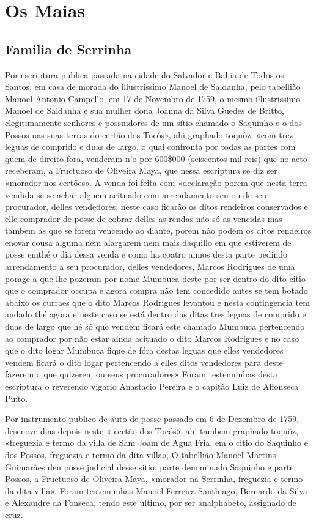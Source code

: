\chapter{Os Maias}
\section*{Familia de Serrinha}
Por escriptura publica passada na cidade do Salvador e Bahia de Todos os Santos, em casa de morada do illustrissimo Manoel de Saldanha, pelo tabellião Manoel Antonio Campello, em 17 de Novembro de 1759, o mesmo illustrissimo Manoel de Saldanha e sua mulher dona Joanna da Silva Guedes de Britto, clegitimamente senhores e possuidores de um sítio chamado o Saquinho e o dos Possos nas suas terras do certão dos Tocós», ahi graphado toquôz, «com trez leguas de comprido e duas de largo, o qual confronta por todas as partes com quem de direito fora, venderam-n'o por 600\$000 (seiscentos mil reis) que no acto receberam, a Fructuoso de Oliveira Maya, que nessa escriptura se diz ser «morador nos certões». A venda foi feita com «declaração porem que nesta terra vendida se se achar alguem acituado com arrendamento seu ou de seu procurador, delles vendedores, neste caso ficarão os ditos rendeiros conservados e elle comprador de posse de cobrar delles as rendas não só as vencidas mas tambem as que se forem vencendo ao diante, porem não podem os ditos rendeiros enovar cousa alguma nem  alargarem nem mais daquillo em que estiverem de posse emthé o dia dessa venda e como ha coatro annos desta parte pedindo arrendamento a seu procurador, delles vendedores, Marcos Rodrigues de uma porage a que lhe pozeram por nome Mumbuca deste por ser dentro do dito citio que o comprador occupa e agora compra não tem concedido antes se tem botado abaixo os curraes que o dito Marcos Rodrigues levantou e nesta contingencia tem andado thé agora e neste caso se está dentro das ditas tres leguas de comprido e duas de largo que hé só que vendem ficará este chamado Mumbuca pertencendo ao comprador por não estar ainda acituado o dito Marcos Rodrigues e no caso que o dito logar Mumbuca fique de fóra destas leguas que elles vendedores vendem ficará o dito logar pertencendo a elles ditos vendedores para deste fazerem o que quizerem ou seus procuradores» Foram testemunhas desta escriptura o reverendo vigario Anastacio Pereira e o capitão Luiz de Affonseca Pinto.

Por instrumento publico de auto de posse passado em 6 de Dezembro de 1759, desenove dias depois neste « certão dos Tocós», ahi tambem graphado toquôz, «freguezia e termo da villa de Sam Joam de Agua Fria, em o citio do Saquinho e dos Possos, freguezia e termo da dita villa», O tabellião Manoel Martins Guimarães deu posse judicial desse sitio, parte denominado Saquinho e parte Possos, a Fructuoso de Oliveira Maya, «morador na Serrinha, freguezia e termo da dita villa». Foram testemunhas Manoel Ferreira Santhiago, Bernardo da Silva e Alexandre da Fonseca, tendo este ultimo, por ser analphabeto, assignado de cruz.

